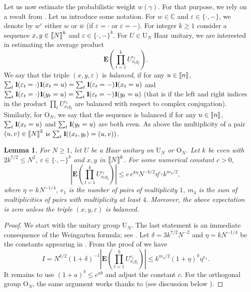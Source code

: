 \documentclass[11pt]{article}
\newtheorem{lemma}{Lemma}[section]
\newcommand{\EE}{{\mathbf{E}}}
\newcommand{\dU}{\mathrm {U}}
\newcommand{\dO}{\mathrm{O}}
\newcommand{\dC}{\mathbb {C}}
\newcommand{\PAR}[1]{{{\left(#1\right)}}} %
\newcommand{\1}{1\!\!{\sf I}}
\newcommand{\IND}{\1}
\newcommand{\veps}{\varepsilon}
\newcommand{\INT}[1]{{{\left[\hspace{-1.4pt}\left[#1\right]\hspace{-1.4pt}\right]}}}
\begin{document}
Let us now estimate the probabilistic weight $w(\gamma)$.  For that purpose, we rely on a result from \cite{BC2}. Let us introduce some notation. For $w \in \dC$ and $\veps \in \{\cdot,-\}$, we denote by $w^\veps$ either $w$ or $\bar w$ (if $\veps = \cdot$ or $\veps = -$). For integer $k \geq 1$ consider a sequence $x,y \in \INT{N}^k$ and $\veps \in \{\cdot , -\}^k$. For $U \in \dU_N$ Haar unitary, we are interested in estimating the average product
$$
 \EE \PAR{\prod_{t=1}^k  U_{x_{t} y_{t}}^{\varepsilon_{t}}}. 
$$
We say that the triple $(x,y,\veps)$ is {\em balanced}, if for any $u \in \INT{n}$, $\sum_{t} \IND ( \veps_t = \cdot ) \IND ( x_t = u) = \sum_{t} \IND ( \veps_t = - ) \IND ( x_t = u)$ and $\sum_{t} \IND ( \veps_t = \cdot ) \IND ( y_t = u) = \sum_{t} \IND ( \veps_t = - ) \IND ( y_t = u)$ (that is if the left and right indices in the product $\prod_t U_{x_{t} y_{t}}^{\varepsilon_{t}}$ are balanced with respect to complex conjugation). Similarly, for $\dO_N$, we say that the sequence is balanced if for  any $u \in \INT{n}$, $\sum_{t}  \IND ( x_t = u) $ and $\sum_t \IND( y_t = u)$ are both even. As above the multiplicity of a pair $(u,v) \in \INT{N}^2$ is $\sum_{t} \IND ( (x_t,y_t) = (u,v) ) $.  
 
\begin{lemma}\label{cor:WG2} For $N \geq 1$, let $U$ be a Haar unitary on $\dU_N$ or $\dO_N$. 
 Let $k$ be even with $2 k^{7/2} \leq  N^{2}$, $\veps \in \{\cdot,-\}^k$ and $x,y$ in  $\INT{N}^k$. For some numerical 
 constant $c>0$, 
$$\left| \EE \PAR{\prod_{t=1}^k  U_{x_{t} y_{t}}^{\varepsilon_{t}} }  \right| \leq c\, e^{k\eta} N^{-k/2}  \eta^{ e_1 } k^{m_4/2},$$
where $\eta =  k^{} N^{-1/4}$, $e_1$ is the number of pairs of multiplicity $1$,
$m_{4}$ is the sum of multiplicities of pairs with multiplicity at least $4$. Moreover, the above expectation is zero unless the triple $(x,y,\veps)$ is balanced.
\end{lemma}

\begin{proof}
We start with the unitary group $\dU_N$. The last statement is an immediate consequence of the Weingarten formula; see \cite[Theorem 4]{BC2}. Let $\delta = 3 k ^{7/2} N^{-2}$ and $\eta = k N^{-1/4}$ be the constants appearing in \cite[Theorem 11]{BC2}. From the proof of \cite[Corollary 14]{BC2}  we have 
$$
I = N^{k/2} (1+\delta)^{-1} \left| \EE \PAR{\prod_{t=1}^k  U_{x_{i} y_{i}}^{\varepsilon_{i}} }  \right| \leq k^{ m_4/2} (1+ \eta)^k \eta^{e_1}.
$$
It remains to use $(1+a)^b \leq e^{ab}$ and adjust the constant $c$. For the orthogonal group $\dO_N$, the same argument works thanks to \cite[Theorem 16]{BC2} (see discussion below  \cite[Theorem 16]{BC2}).
\end{proof}
\end{document}
